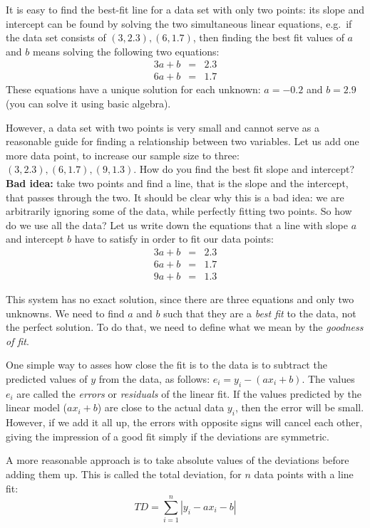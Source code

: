 \documentclass[
  letterpaper,
  DIV=11,
  numbers=noendperiod]{scrreprt}
\begin{document}
It is easy to find the best-fit line for a data set with only two
points: its slope and intercept can be found by solving the two
simultaneous linear equations, e.g.~if the data set consists of
\((3,2.3), (6, 1.7)\), then finding the best fit values of \(a\) and
\(b\) means solving the following two equations: \begin{eqnarray*}
3a + b &=&  2.3 \\
6a + b &=& 1.7
\end{eqnarray*} These equations have a unique solution for each unknown:
\(a=-0.2\) and \(b=2.9\) (you can solve it using basic algebra).

However, a data set with two points is very small and cannot serve as a
reasonable guide for finding a relationship between two variables. Let
us add one more data point, to increase our sample size to three:
\((3,2.3), (6, 1.7), (9, 1.3)\). How do you find the best fit slope and
intercept? \textbf{Bad idea:} take two points and find a line, that is
the slope and the intercept, that passes through the two. It should be
clear why this is a bad idea: we are arbitrarily ignoring some of the
data, while perfectly fitting two points. So how do we use all the data?
Let us write down the equations that a line with slope \(a\) and
intercept \(b\) have to satisfy in order to fit our data points:
\begin{eqnarray}
3a + b &=&  2.3 \\
6a + b &=& 1.7 \\
9a + b &=& 1.3
\end{eqnarray}

This system has no exact solution, since there are three equations and
only two unknowns. We need to find \(a\) and \(b\) such that they are a
\emph{best fit} to the data, not the perfect solution. To do that, we
need to define what we mean by the 
\emph{goodness of fit}.

One simple way to asses how close the fit is to the data is to subtract
the predicted values of \(y\) from the data, as follows:
\(e_i = y_i - (ax_i + b)\). The values \(e_i\) are called the
\emph{errors} or  \emph{residuals} of
the linear fit. If the values predicted by the linear model (\(ax_i+b\))
are close to the actual data \(y_i\), then the error will be small.
However, if we add it all up, the errors with opposite signs will cancel
each other, giving the impression of a good fit simply if the deviations
are symmetric.

A more reasonable approach is to take absolute values of the deviations
before adding them up. This is called the total deviation, for \(n\)
data points with a line fit:
\[ TD = \sum_{i=1}^n |  y_i - a x_i - b | \]
\end{document}
